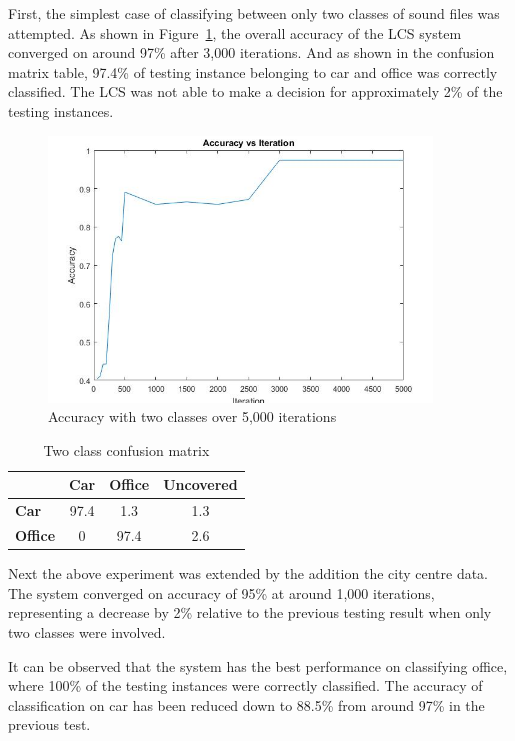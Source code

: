 \documentclass[11pt]{article}
\begin{document}
First, the simplest case of classifying between only two classes of sound files was attempted. As shown in Figure~\ref{fig:twoClass}, the overall accuracy of the LCS system converged on around 97\% after 3,000 iterations. And as shown in the confusion matrix table, 97.4\% of testing instance belonging to car and office was correctly classified. The LCS was not able to make a decision for approximately 2\% of the testing instances.

\begin{figure}[!htbp]
	\centering
	\includegraphics[width=0.6\linewidth]{yiyang_figures/1.png}
	\caption{Accuracy with two classes over 5,000 iterations}
	\label{fig:twoClass}
\end{figure}

\begin{table}[!htbp]
	\centering
	\caption{Two class confusion matrix}
	\label{tab:conf2}
	\begin{tabularx}{0.43\textwidth}{lccc}
		\toprule
		                & \textbf{Car} & \textbf{Office} & \textbf{Uncovered} \\ \midrule
		 \textbf{Car}   &     97.4     & 1.3             & 1.3                \\
		\textbf{Office} &      0       & 97.4            & 2.6                \\ \bottomrule
	\end{tabularx}
\end{table}



Next the above experiment was extended by the addition the city centre data. The system converged on accuracy of 95\% at around 1,000 iterations, representing a decrease by 2\% relative to the previous testing result when only two classes were involved.

It can be observed that the system has the best performance on classifying office, where 100\% of the testing instances were correctly classified. The accuracy of classification on car has been reduced down to 88.5\% from around 97\% in the previous test. 
\end{document}
